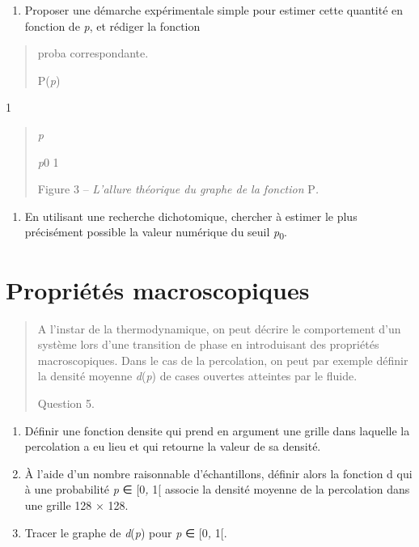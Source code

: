 \documentclass[]{article}
\begin{document}
\begin{enumerate}
\def\labelenumi{\alph{enumi})}
\item
  Proposer une démarche expérimentale simple pour estimer cette quantité
  en fonction de \emph{p}, et rédiger la fonction
\end{enumerate}

\begin{quote}
proba correspondante.

P(\emph{p})
\end{quote}

1

\begin{quote}
\emph{p}

\emph{p}0 1

Figure 3 -- \emph{L'allure théorique du graphe de la fonction} P\emph{.}
\end{quote}

\begin{enumerate}
\def\labelenumi{\alph{enumi})}
\item
  En utilisant une recherche dichotomique, chercher à estimer le plus
  précisément possible la valeur numérique du seuil
  \emph{p}\textsubscript{0}.
\end{enumerate}

\section{Propriétés
macroscopiques}\label{propriuxe9tuxe9s-macroscopiques}

\begin{quote}
A l'instar de la thermodynamique, on peut décrire le comportement d'un
système lors d'une transition de phase en introduisant des propriétés
macroscopiques. Dans le cas de la percolation, on peut par exemple
définir la densité moyenne \emph{d}(\emph{p}) de cases ouvertes
atteintes par le fluide.

Question 5.
\end{quote}

\begin{enumerate}
\def\labelenumi{\alph{enumi})}
\item
  Définir une fonction densite qui prend en argument une grille dans
  laquelle la percolation a eu lieu et qui retourne la valeur de sa
  densité.
\item
  À l'aide d'un nombre raisonnable d'échantillons, définir alors la
  fonction d qui à une probabilité \emph{p} ∈ {[}0\emph{,} 1{[} associe
  la densité moyenne de la percolation dans une grille 128 × 128.
\item
  Tracer le graphe de \emph{d}(\emph{p}) pour \emph{p} ∈ {[}0\emph{,}
  1{[}.
\end{enumerate}
\end{document}

